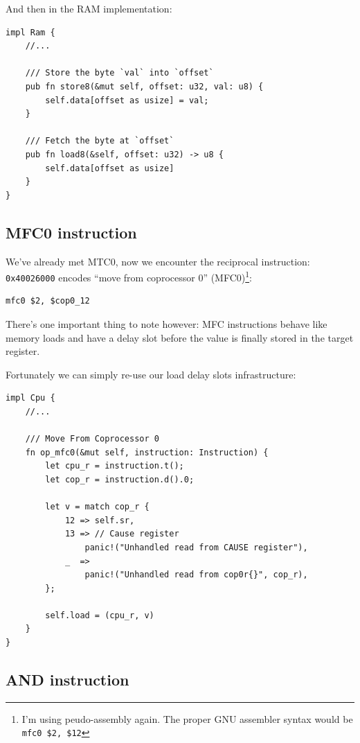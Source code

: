 \documentclass[a4paper]{article}
\newcommand{\code}[1] {\texttt{#1}}
\begin{document}
And then in the RAM implementation:

\begin{lstlisting}
impl Ram {
    //...

    /// Store the byte `val` into `offset`
    pub fn store8(&mut self, offset: u32, val: u8) {
        self.data[offset as usize] = val;
    }

    /// Fetch the byte at `offset`
    pub fn load8(&self, offset: u32) -> u8 {
        self.data[offset as usize]
    }
}
\end{lstlisting}

\subsection{MFC0 instruction}

We've already met MTC0, now we encounter the reciprocal instruction:
\code{0x40026000} encodes ``move from coprocessor 0''
(MFC0)\footnote{I'm using peudo-assembly again. The proper GNU
  assembler syntax would be \code{mfc0~\$2,~\$12}}:

\begin{lstlisting}[language=assembly]
mfc0 $2, $cop0_12
\end{lstlisting}

There's one important thing to note however: MFC instructions behave
like memory loads and have a delay slot before the value is finally
stored in the target register.

Fortunately we can simply re-use our load delay slots infrastructure:

\begin{lstlisting}
impl Cpu {
    //...

    /// Move From Coprocessor 0
    fn op_mfc0(&mut self, instruction: Instruction) {
        let cpu_r = instruction.t();
        let cop_r = instruction.d().0;

        let v = match cop_r {
            12 => self.sr,
            13 => // Cause register
                panic!("Unhandled read from CAUSE register"),
            _  =>
                panic!("Unhandled read from cop0r{}", cop_r),
        };

        self.load = (cpu_r, v)
    }
}
\end{lstlisting}

\subsection{AND instruction}
\end{document}
